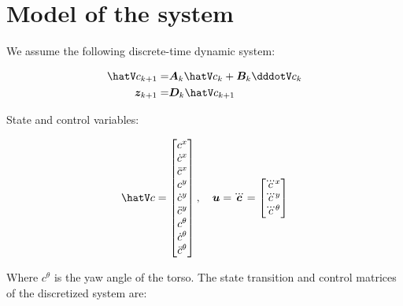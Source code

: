 \documentclass[a4paper]{article}
\begin{document}
\section*{Model of the system}

\noindent We assume the following discrete-time dynamic system:

\begin{equation}
\begin{split}
    \cstate_{k+1} =& \M{A}_k \cstate_k + \M{B}_k \cjerk_k\\
    \cop_{k+1} =& \M{D}_{k} \cstate_{k+1}
\end{split}
\end{equation}

\noindent State and control variables:

\begin{equation}
    \cstate = 
    \begin{bmatrix}
        c^{x}\\
        \dot{c}^{x}\\
        \ddot{c}^{x}\\
        c^{y}\\
        \dot{c}^{y}\\
        \ddot{c}^{y}\\
        c^{\theta} \\ 
        \dot{c}^{\theta} \\
        \ddot{c}^{\theta} \\
    \end{bmatrix},
    \quad
    \V{u} = \dddot{\V{c}} = 
    \begin{bmatrix}
        \dddot{c}^{x}\\
        \dddot{c}^{y}\\
        \dddot{c}^{\theta}\\
    \end{bmatrix}
\end{equation}

\noindent Where $c^{\theta}$ is the yaw angle of the torso. The state transition and control matrices of the discretized system
are:
\end{document}
